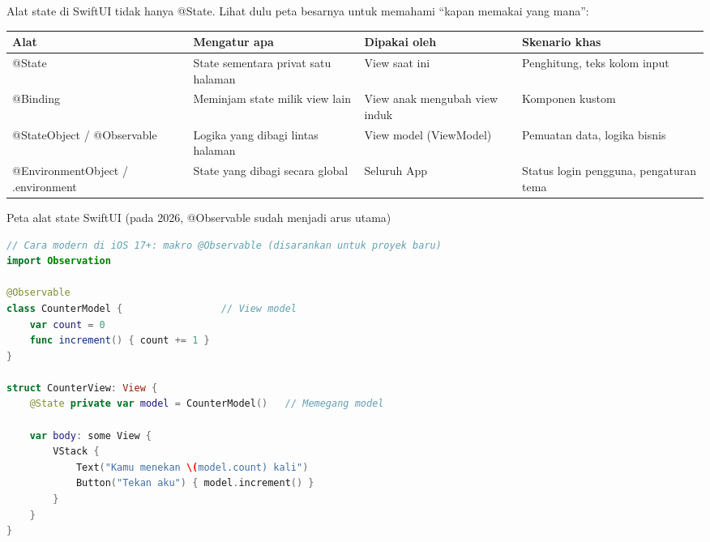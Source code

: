 


Alat state di SwiftUI tidak hanya @State. Lihat dulu peta besarnya untuk memahami “kapan memakai yang mana”:

\begin{center}
\begin{tabularx}{\linewidth}{|X|X|X|X|}
\hline
\textbf{Alat} & \textbf{Mengatur apa} & \textbf{Dipakai oleh} & \textbf{Skenario khas} \tabularnewline
\hline
@State & State sementara privat satu halaman & View saat ini & Penghitung, teks kolom input \tabularnewline
@Binding & Meminjam state milik view lain & View anak mengubah view induk & Komponen kustom \tabularnewline
@StateObject / @Observable & Logika yang dibagi lintas halaman & View model (ViewModel) & Pemuatan data, logika bisnis \tabularnewline
@EnvironmentObject / .environment & State yang dibagi secara global & Seluruh App & Status login pengguna, pengaturan tema \tabularnewline
\hline
\end{tabularx}
\end{center}

\begin{center}\small\color{gray}Peta alat state SwiftUI (pada 2026, @Observable sudah menjadi arus utama)\end{center}

\begin{lstlisting}[language=Swift]
// Cara modern di iOS 17+: makro @Observable (disarankan untuk proyek baru)
import Observation

@Observable
class CounterModel {                 // View model
    var count = 0
    func increment() { count += 1 }
}

struct CounterView: View {
    @State private var model = CounterModel()   // Memegang model

    var body: some View {
        VStack {
            Text("Kamu menekan \(model.count) kali")
            Button("Tekan aku") { model.increment() }
        }
    }
}
\end{lstlisting}

